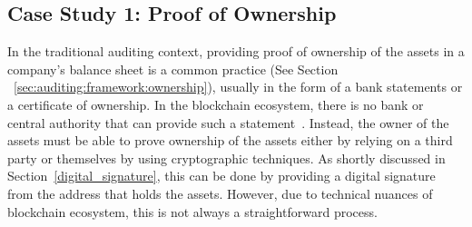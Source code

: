 









\subsection{Case Study 1: Proof of Ownership} \label{sec:auditing:case-studies:ownership}

In the traditional auditing context, providing proof of ownership of the assets in a company's balance sheet is a common practice (See Section ~\ref{sec:auditing:framework:ownership}), usually in the form of a bank statements or a certificate of ownership. In the blockchain ecosystem, there is no bank or central authority that can provide such a statement~\cite{pimentel2021systemizing}. Instead, the owner of the assets must be able to prove ownership of the assets either by relying on a third party or themselves by using cryptographic techniques. As shortly discussed in Section~\ref{digital_signature}, this can be done by providing a digital signature from the address that holds the assets. However, due to technical nuances of blockchain ecosystem, this is not always a straightforward process. 

